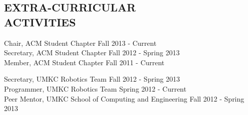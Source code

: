 \documentclass[line,margin]{res}
\begin{document}
\begin{resume}
\section{EXTRA-CURRICULAR \\ ACTIVITIES}             
		Chair, ACM Student Chapter \hfill Fall 2013 - Current \\
		Secretary, ACM Student Chapter \hfill Fall 2012 - Spring 2013 \\	
		Member, ACM Student Chapter \hfill Fall 2011 - Current 
		
		Secretary, UMKC Robotics Team \hfill  Fall 2012 - Spring 2013 \\	
		Programmer, UMKC Robotics Team \hfill Spring 2012 - Current \\

		Peer Mentor, UMKC School of Computing and Engineering \hfill Fall 2012 - Spring 2013 \\	
\end{resume}
\end{document}
